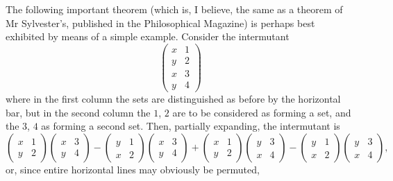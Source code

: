 \documentclass[11pt,a4paper]{book}
\begin{document}
The following important theorem (which is, I believe, the same as a theorem of Mr Sylvester's, published in the Philosophical Magazine) is perhaps best exhibited by means of a simple example. Consider the intermutant
\[\begin{pmatrix} x & 1 \\ y & 2 \\ \hline x & 3 \\ y & 4 \end{pmatrix}\]
where in the first column the sets are distinguished as before by the horizontal bar, but in the second column the $1$, $2$ are to be considered as forming a set, and the $3$, $4$ as forming a second set. Then, partially expanding, the intermutant is
\[\begin{pmatrix} x & 1 \\ y & 2 \end{pmatrix} \begin{pmatrix} x & 3 \\ y & 4 \end{pmatrix} - \begin{pmatrix} y & 1 \\ x & 2 \end{pmatrix} \begin{pmatrix} x & 3 \\ y & 4 \end{pmatrix} + \begin{pmatrix} x & 1 \\ y & 2 \end{pmatrix} \begin{pmatrix} y & 3 \\ x & 4 \end{pmatrix} - \begin{pmatrix} y & 1 \\ x & 2 \end{pmatrix} \begin{pmatrix} y & 3 \\ x & 4 \end{pmatrix},\]
or, since entire horizontal lines may obviously be permuted,
\end{document}
